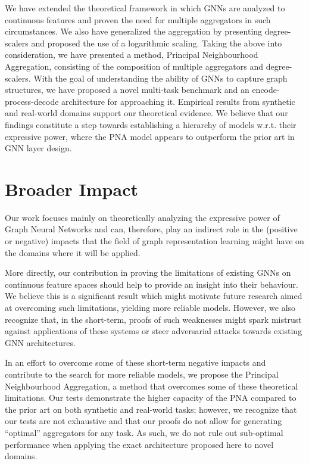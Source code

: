 \documentclass{article}
\begin{document}
We have extended the theoretical framework in which GNNs are analyzed to continuous features and proven the need for multiple aggregators in such circumstances. We also have generalized the  aggregation by presenting degree-scalers and proposed the use of a logarithmic scaling. Taking the above into consideration, we have presented a method, Principal Neighbourhood Aggregation, consisting of the composition of multiple aggregators and degree-scalers. With the goal of understanding the ability of GNNs to capture graph structures, we have proposed a novel multi-task benchmark and an encode-process-decode architecture for approaching it. Empirical results from synthetic and real-world domains support our theoretical evidence. We believe that our findings constitute a step towards establishing a hierarchy of models w.r.t. their expressive power, where the PNA model appears to outperform the prior art in GNN layer design.

\section*{Broader Impact}

Our work focuses mainly on theoretically analyzing the expressive power of Graph Neural Networks and can, therefore, play an indirect role in the (positive or negative) impacts that the field of graph representation learning might have on the domains where it will be applied.

More directly, our contribution in proving the limitations of existing GNNs on continuous feature spaces should help to provide an insight into their behaviour. We believe this is a significant result which might motivate future research aimed at overcoming such limitations, yielding more reliable models. However, we also recognize that, in the short-term, proofs of such weaknesses might spark mistrust against applications of these systems or steer adversarial attacks towards existing GNN architectures.

In an effort to overcome some of these short-term negative impacts and contribute to the search for more reliable models, we propose the Principal Neighbourhood Aggregation, a method that overcomes some of these theoretical limitations. Our tests demonstrate the higher capacity of the PNA compared to the prior art on both synthetic and real-world tasks; however, we recognize that our tests are not exhaustive and that our proofs do not allow for generating ``optimal'' aggregators for any task. As such, we do not rule out sub-optimal performance when applying the exact architecture proposed here to novel domains.
\end{document}
